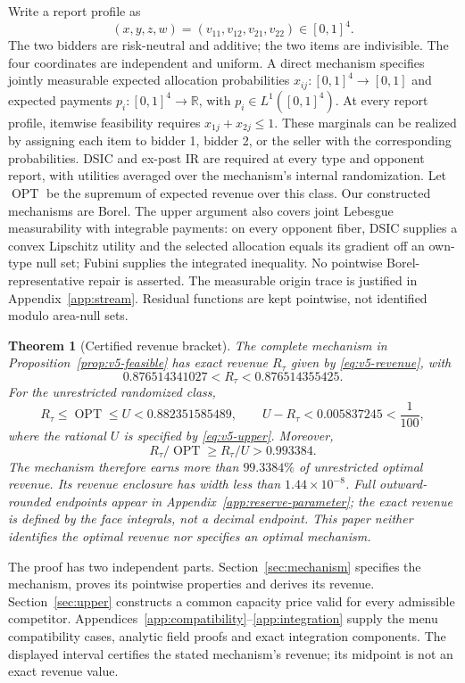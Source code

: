 \documentclass[11pt]{article}
\newtheorem{theorem}{Theorem}
\newcommand{\OPT}{\operatorname{OPT}}
\begin{document}
Write a report profile as
\[
 (x,y,z,w)=(v_{11},v_{12},v_{21},v_{22})\in[0,1]^4.
\]
The two bidders are risk-neutral and additive; the two items are indivisible.
The four coordinates are independent and uniform.  A direct mechanism
specifies jointly measurable expected allocation probabilities
\(x_{ij}:[0,1]^4\to[0,1]\) and expected payments
\(p_i:[0,1]^4\to\mathbb R\), with \(p_i\in L^1([0,1]^4)\).
At every report profile, itemwise feasibility requires
\(x_{1j}+x_{2j}\leq1\).  These marginals can be realized by assigning each
item to bidder 1, bidder 2, or the seller with the corresponding probabilities.
DSIC and ex-post IR are required at every type and opponent report, with
utilities averaged over the mechanism's internal randomization.  Let \(\OPT\)
be the supremum of expected revenue over this class.
Our constructed mechanisms are Borel. The upper argument also covers joint
Lebesgue measurability with integrable payments: on every opponent fiber,
DSIC supplies a convex Lipschitz utility and the selected allocation equals
its gradient off an own-type null set; Fubini supplies the integrated
inequality. No pointwise Borel-representative repair is asserted. The measurable origin trace is justified in Appendix~\ref{app:stream}.
Residual functions are kept pointwise, not identified modulo area-null sets.

\begin{theorem}[Certified revenue bracket]\label{thm:bracket}
The complete mechanism in Proposition~\ref{prop:v5-feasible} has exact
revenue $R_\tau$ given by \eqref{eq:v5-revenue}, with
\[
 0.876514341027<R_\tau<0.876514355425.
\]
For the unrestricted randomized class,
\[
 R_\tau\le\OPT\le U<0.882351585489,\qquad
 U-R_\tau<0.005837245<\frac1{100},
\]
where the rational $U$ is specified by \eqref{eq:v5-upper}. Moreover,
\[
 R_\tau/\OPT\ge R_\tau/U>0.993384.
\]
The mechanism therefore earns more than $99.3384\%$ of unrestricted
optimal revenue. Its revenue enclosure has width less than $1.44\times10^{-8}$.
Full outward-rounded endpoints appear in Appendix~\ref{app:reserve-parameter};
the exact revenue is defined by the face integrals, not a decimal endpoint.
This paper neither identifies the optimal revenue nor specifies an optimal mechanism.
\end{theorem}


The proof has two independent parts. Section~\ref{sec:mechanism} specifies
the mechanism, proves its pointwise properties and derives its revenue.
Section~\ref{sec:upper} constructs a common capacity price valid for every
admissible competitor. Appendices~\ref{app:compatibility}--\ref{app:integration}
supply the menu compatibility cases, analytic field proofs and exact
integration components. The displayed interval certifies the stated
mechanism's revenue; its midpoint is not an exact revenue value.
\end{document}
